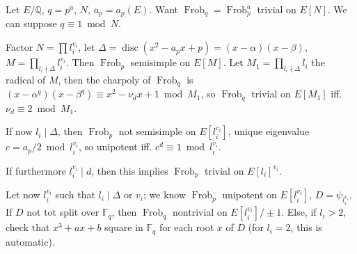 \documentclass[12pt]{article}
\newcommand{\Q}{\mathbb{Q}}
\newcommand{\F}{\mathbb{F}}
\newcommand{\disc}{\operatorname{disc}}
\newcommand{\Frob}{\operatorname{Frob}}
\theoremstyle{definition}
\begin{document}
Let $E/\Q$, $q=p^a$, $N$, $a_p=a_p(E)$. Want $\Frob_q = \Frob_p^a$ trivial on $E[N]$. We can suppose $q \equiv 1 \bmod N$.

Factor $N = \prod l_i^{v_i}$, let $\Delta = \disc(x^2-a_p x+p)=(x-\alpha)(x-\beta)$, $M = \prod_{l_i \nmid \Delta} l_i^{v_i}$. Then $\Frob_p$ semisimple on $E[M]$. Let $M_1 = \prod_{l_i \nmid \Delta} l_i$ the radical of $M$, then the charpoly of $\Frob_q$ is $(x-\alpha^q)(x-\beta^q) \equiv x^2-\nu_d x + 1 \bmod M_1$, so $\Frob_q$ trivial on $E[M_1]$ iff. $\nu_d \equiv 2 \bmod M_1$.

If now $l_i \mid \Delta$, then $\Frob_p$ not semisimple on $E[l_i^{v_i}]$, unique eigenvalue $c = a_p/2 \bmod l_i^{v_i}$, so unipotent iff. $c^d \equiv 1 \bmod l_i^{v_i}$.

If furthermore $l_i^{v_i} \mid d$, then this implies $\Frob_p$ trivial on $E[l_i]^{v_i}$.

Let now $l_i^{v_i}$ such that $l_i \mid \Delta$ or $v_i$; we know $\Frob_p$ unipotent on $E[l_i^{v_i}]$, $D=\psi_{l_i^{v_i}}$. If $D$ not tot split over $\F_q$, then $\Frob_q$ nontrivial on $E[l_i^{v_i}]/\pm1$. Else, if $l_i > 2$, check that $x^3+ax+b$ square in $\F_q$ for each root $x$ of $D$ (for $l_i=2$, this is automatic). 
\end{document}
